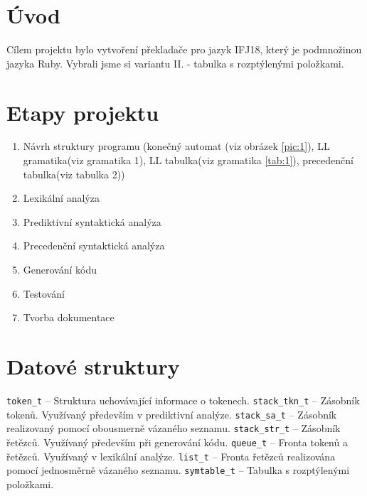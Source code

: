 \documentclass[11pt, a4paper]{article}
\begin{document}
\section{Úvod}
Cílem projektu bylo vytvoření překladače pro jazyk IFJ18, který je podmnožinou jazyka Ruby. Vybrali jsme si variantu II. - tabulka s rozptýlenými položkami.

\section{Etapy projektu}
\begin{enumerate}
  \item Návrh struktury programu (konečný automat (viz obrázek \ref{pic:1}), LL gramatika(viz gramatika 1), LL tabulka(viz gramatika \ref{tab:1}), precedenční tabulka(viz tabulka 2))
  \vspace{-0.6em}
  \item Lexikální analýza
  \vspace{-0.6em}
  \item Prediktivní syntaktická analýza 
  \vspace{-0.6em}
  \item Precedenční syntaktická analýza 
  \vspace{-0.6em}
  \item Generování kódu
  \vspace{-0.6em}
  \item Testování
  \vspace{-0.6em}
  \item Tvorba dokumentace
  \vspace{-0.6em}
\end{enumerate}


\section{Datové struktury}
\noindent
\verb|token_t| -- Struktura uchovávající informace o tokenech. \newline
\verb|stack_tkn_t| -- Zásobník tokenů. Využívaný především v prediktivní analýze. \newline
\verb|stack_sa_t| -- Zásobník realizovaný pomocí obousmerně vázaného seznamu. \newline
\verb|stack_str_t| -- Zásobník řetězců. Využívaný především při generování kódu. \newline
\verb|queue_t| -- Fronta tokenů a řetězců. Využívaný v lexikální analýze.\newline
\verb|list_t| -- Fronta řetězců realizována pomocí jednosměrně vázaného seznamu.\newline
\verb|symtable_t| -- Tabulka s rozptýlenými položkami.\newline
\end{document}
